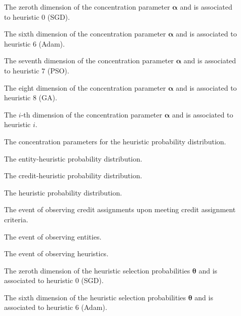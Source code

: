 \begin{description}
	\item [\parbox{2cm}{$\alpha_{0}$}] \parbox{12.5cm}{The zeroth dimension of the concentration parameter $\boldsymbol{\alpha}$ and is associated to heuristic $0$ (\acs{SGD}).}
	\item [\parbox{2cm}{$\alpha_{6}$}] \parbox{12.5cm}{The sixth dimension of the concentration parameter $\boldsymbol{\alpha}$ and is associated to heuristic $6$ (\acs{Adam}).}
	\item [\parbox{2cm}{$\alpha_{7}$}] \parbox{12.5cm}{The seventh dimension of the concentration parameter $\boldsymbol{\alpha}$ and is associated to heuristic $7$ (\acs{PSO}).}
	\item [\parbox{2cm}{$\alpha_{8}$}] \parbox{12.5cm}{The eight dimension of the concentration parameter $\boldsymbol{\alpha}$ and is associated to heuristic $8$ (\acs{GA}).}
	\item [\parbox{2cm}{$\alpha_{i}$}] \parbox{12.5cm}{The $i$-th dimension of the concentration parameter $\boldsymbol{\alpha}$ and is associated to heuristic $i$.}
	\item [\parbox{2cm}{$\boldsymbol{\alpha}$}] \parbox{12.5cm}{The concentration parameters for the heuristic probability distribution.}
	\item [\parbox{2cm}{$\boldsymbol{\phi}$}] \parbox{12.5cm}{The entity-heuristic probability distribution.}
	\item [\parbox{2cm}{$\boldsymbol{\psi}$}] \parbox{12.5cm}{The credit-heuristic probability distribution.}
	\item [\parbox{2cm}{$\boldsymbol{\theta}$}] \parbox{12.5cm}{The heuristic probability distribution.}
	\item [\parbox{2cm}{$\boldsymbol{C}$}] \parbox{12.5cm}{The event of observing credit assignments upon meeting credit assignment criteria.}
	\item [\parbox{2cm}{$\boldsymbol{E}$}] \parbox{12.5cm}{The event of observing entities.}
	\item [\parbox{2cm}{$\boldsymbol{H}$}] \parbox{12.5cm}{The event of observing heuristics.}
	\item [\parbox{2cm}{$\theta_{0}$}] \parbox{12.5cm}{The zeroth dimension of the heuristic selection probabilities $\boldsymbol{\theta}$ and is associated to heuristic $0$ (\acs{SGD}).}
	\item [\parbox{2cm}{$\theta_{6}$}] \parbox{12.5cm}{The sixth dimension of the heuristic selection probabilities $\boldsymbol{\theta}$ and is associated to heuristic $6$ (\acs{Adam}).}

\end{description}
